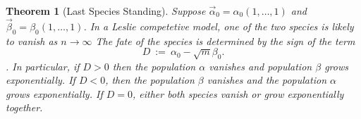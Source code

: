 \documentclass[11pt,reqno]{amsart}
\numberwithin{equation}{section}
\theoremstyle{plain}
\newtheorem{theorem}[thm]{Theorem}
\begin{document}
\begin{theorem}[Last Species Standing]
    Suppose $\vec \alpha_0 = \alpha_0 (1, \dots, 1)$ and 
    $\vec \beta_0 = \beta_0 (1, \dots, 1)$.
    In a Leslie competetive model, one of the two 
    species is likely to vanish as $n \rightarrow \infty$  
    The fate of the species is determined 
    by the sign of the term 
    \begin{equation}
        D \ :=\ \alpha_0 - \sqrt{m} \beta_0.
    \end{equation}
    . In particular, if $D > 0$ then the population $\alpha$ 
    vanishes and population $\beta$ grows exponentially.
     If $D < 0$, then the population $\beta$ vanishes and the population $\alpha$ 
     grows exponentially. 
    If $D = 0$, either both species vanish or grow exponentially together. 
\end{theorem}
\end{document}
